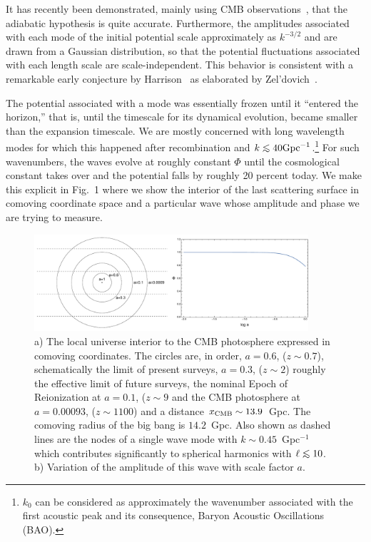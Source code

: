 \documentclass[psfig,11pt]{article}
\def\lo{\mathrel{\raise.3ex\hbox{$<$}\mkern-14mu\lower0.6ex\hbox{$\sim$}}}
\begin{document}
It has recently been demonstrated, mainly using CMB observations~\cite{Planck2015cosmopara}, that the adiabatic hypothesis is quite accurate. Furthermore, the amplitudes associated with each mode of the initial potential scale approximately as $k^{-3/2}$ and are drawn from a Gaussian distribution, so that the potential fluctuations associated with each length scale are scale-independent. This behavior is consistent with a remarkable early conjecture by Harrison~\cite{Harrison1970} as elaborated by Zel'dovich~\cite{Zeldovich1972}.

The potential associated with a mode was essentially frozen until it ``entered the horizon,'' that is, until the timescale for its dynamical evolution, became smaller than the expansion timescale. We are mostly concerned with long wavelength modes for which this happened after recombination and $k\lo40{\rm Gpc}^{-1}$.\footnote{$k_0$ can be considered as approximately the wavenumber associated with the first acoustic peak and its consequence, Baryon Acoustic Oscillations (BAO).} For such wavenumbers, the waves evolve at roughly constant $\Phi$ until the cosmological constant takes over and the potential falls by roughly 20 percent today. We make this explicit in Fig.~1 where we show the interior of the last scattering surface in comoving coordinate space and a particular wave whose amplitude and phase we are trying to measure.
\begin{figure}[t]
\centering
\includegraphics[width=4in]{figures/nsffig1.pdf}
\caption{\small{a) The local universe interior to the CMB photosphere expressed in comoving coordinates. The circles are, in order, $a=0.6$, ($z\sim0.7$), schematically the limit of present surveys, $a=0.3$, ($z\sim2$) roughly the effective limit of future surveys, the nominal Epoch of Reionization at $a=0.1$, ($z\sim9$ and the CMB photosphere at $a=0.00093$, ($z\sim1100$) and a distance $x_{\rm CMB}\sim13.9$~Gpc. The comoving radius of the big bang is $14.2$~Gpc. Also shown as dashed lines are the nodes of a single wave mode with $k\sim0.45$~Gpc$^{-1}$ which contributes significantly to spherical harmonics with $\ell\lo10$. b) Variation of the amplitude of this wave with scale factor $a$.}}
\end{figure}
\end{document}
